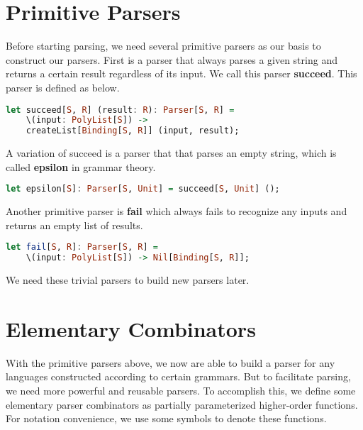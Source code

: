 \section{Primitive Parsers}
Before starting parsing, we need several primitive parsers as our basis to construct our parsers. First is a parser that always parses a given string and returns a certain result regardless of its input. We call this parser \textbf{succeed}. This parser is defined as below.
\begin{singlespace}
\begin{lstlisting}[language=Haskell,basicstyle=\small]
  let succeed[S, R] (result: R): Parser[S, R] =
	\(input: PolyList[S]) -> 
	createList[Binding[S, R]] (input, result);
\end{lstlisting}
\end{singlespace}
A variation of succeed is a parser that that parses an empty string, which is called \textbf{epsilon} in grammar theory.
\begin{singlespace}
\begin{lstlisting}[language=Haskell,basicstyle=\small]
  let epsilon[S]: Parser[S, Unit] = succeed[S, Unit] ();
\end{lstlisting}
\end{singlespace}
Another primitive parser is \textbf{fail} which always fails to recognize any inputs and returns an empty list of results.
\begin{singlespace}
\begin{lstlisting}[language=Haskell,basicstyle=\small]
  let fail[S, R]: Parser[S, R] =
	\(input: PolyList[S]) -> Nil[Binding[S, R]];
\end{lstlisting}
\end{singlespace}
We need these trivial parsers to build new parsers later.

\section{Elementary Combinators}
With the primitive parsers above, we now are able to build a parser for any languages constructed according to certain grammars. But to facilitate parsing, we need more powerful and reusable parsers. To accomplish this, we define some elementary parser combinators as partially parameterized higher-order functions. For notation convenience, we use some symbols to denote these functions.

